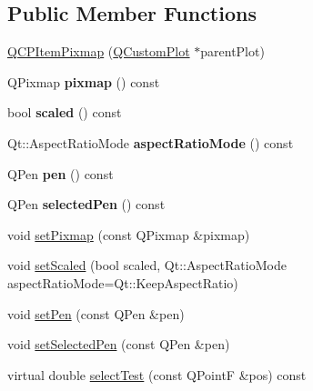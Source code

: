 \subsection*{Public Member Functions}
\begin{DoxyCompactItemize}
\item 
\hyperlink{classQCPItemPixmap_aa6de42a37261b21a5480e7da122345c3}{Q\-C\-P\-Item\-Pixmap} (\hyperlink{classQCustomPlot}{Q\-Custom\-Plot} $\ast$parent\-Plot)
\item 
\hypertarget{classQCPItemPixmap_a73dea89e0eb45127a2705e2c7991b8d8}{Q\-Pixmap {\bfseries pixmap} () const }\label{classQCPItemPixmap_a73dea89e0eb45127a2705e2c7991b8d8}

\item 
\hypertarget{classQCPItemPixmap_a54026b89dff3c60376c2360f01b6fb83}{bool {\bfseries scaled} () const }\label{classQCPItemPixmap_a54026b89dff3c60376c2360f01b6fb83}

\item 
\hypertarget{classQCPItemPixmap_ac5b95c097169e107a61eebbb7c77523c}{Qt\-::\-Aspect\-Ratio\-Mode {\bfseries aspect\-Ratio\-Mode} () const }\label{classQCPItemPixmap_ac5b95c097169e107a61eebbb7c77523c}

\item 
\hypertarget{classQCPItemPixmap_ab2b821c80cfade589472e933b9c4361f}{Q\-Pen {\bfseries pen} () const }\label{classQCPItemPixmap_ab2b821c80cfade589472e933b9c4361f}

\item 
\hypertarget{classQCPItemPixmap_af8e839d7c7b84e214608feda3caec2bc}{Q\-Pen {\bfseries selected\-Pen} () const }\label{classQCPItemPixmap_af8e839d7c7b84e214608feda3caec2bc}

\item 
void \hyperlink{classQCPItemPixmap_a726b69ea4025edf48f9b29b6450548a7}{set\-Pixmap} (const Q\-Pixmap \&pixmap)
\item 
void \hyperlink{classQCPItemPixmap_aea813ff1b12163ae5d3ac182593b1d6f}{set\-Scaled} (bool scaled, Qt\-::\-Aspect\-Ratio\-Mode aspect\-Ratio\-Mode=Qt\-::\-Keep\-Aspect\-Ratio)
\item 
void \hyperlink{classQCPItemPixmap_acdade1305edb4b5cae14f97fd132065f}{set\-Pen} (const Q\-Pen \&pen)
\item 
void \hyperlink{classQCPItemPixmap_afc5e479e88e53740176ce77cb70dd67a}{set\-Selected\-Pen} (const Q\-Pen \&pen)
\item 
virtual double \hyperlink{classQCPItemPixmap_ab725f1025891e9284f75bbe1cb4cabfa}{select\-Test} (const Q\-Point\-F \&pos) const 
\end{DoxyCompactItemize}
